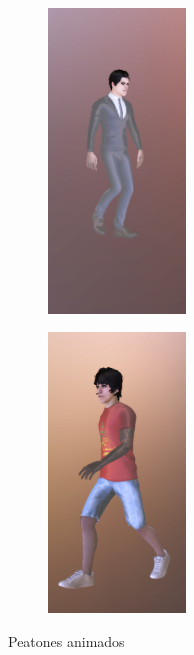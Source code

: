 \documentclass{report}
\begin{document}
\renewcommand{\figurename}{Figura}		
\begin{figure}[!h]
\centering
  \begin{subfigure}[b]{0.49\textwidth}
  \centering
    \includegraphics[width=0.4\textwidth, height=0.7\textwidth]{images/cap4/person.jpg}
    \label{fig:f1}
  \end{subfigure}
  \hfill
  \begin{subfigure}[b]{0.49\textwidth}
  \centering
    \includegraphics[width=0.4\textwidth, height=0.7\textwidth]{images/cap4/person2.jpg}
    \label{fig:f2}
  \end{subfigure}
  \caption{Peatones animados}
\end{figure}

\hfill \break
\hfill \break
\hfill \break
\end{document}
